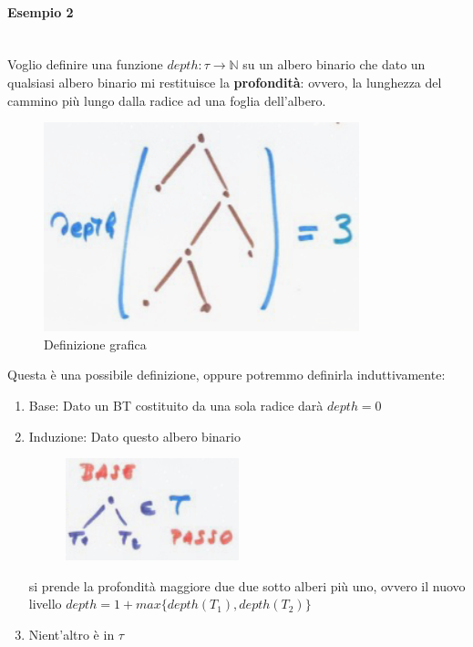 \documentclass{article}
\begin{document}
\paragraph{Esempio 2}\mbox{}\\
Voglio definire una funzione $depth: \tau\rightarrow\mathbb{N}$ su un albero binario che
dato un qualsiasi albero binario mi restituisce la \textbf{profondità}: ovvero, la lunghezza del
cammino più lungo dalla radice ad una foglia dell'albero.
\begin{figure}[H]
    \centering
    \includegraphics[scale=0.6]{images/profondità.png}
    \caption{Definizione grafica}
\end{figure}
Questa è una possibile definizione, oppure potremmo definirla induttivamente:
\begin{enumerate}
    \item Base: Dato un BT costituito da una sola radice darà $depth=0$
    \item Induzione: Dato questo albero binario
          \begin{figure}[H]
              \centering
              \includegraphics[scale=0.6]{images/passo_ind_depth.png}
          \end{figure}
          si prende la profondità maggiore due due sotto alberi più uno, ovvero il nuovo livello
          $depth=1+max\{depth(T_1),depth(T_2)\}$
    \item Nient'altro è in $\tau$
\end{enumerate}
\end{document}
